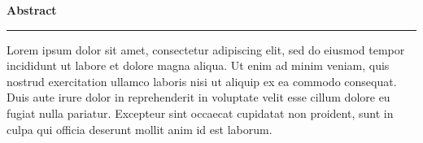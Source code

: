 \clearpage
\begin{centering}
\vspace{\baselineskip}
\end{centering}

{\LARGE\textbf{Abstract}}
\\
\noindent\rule{15cm}{0.9pt}
\vspace{\baselineskip}

Lorem ipsum dolor sit amet, consectetur adipiscing elit, sed do eiusmod tempor incididunt ut labore et dolore magna aliqua. Ut enim ad minim veniam, quis nostrud exercitation ullamco laboris nisi ut aliquip ex ea commodo consequat. Duis aute irure dolor in reprehenderit in voluptate velit esse cillum dolore eu fugiat nulla pariatur. Excepteur sint occaecat cupidatat non proident, sunt in culpa qui officia deserunt mollit anim id est laborum.


\clearpage
